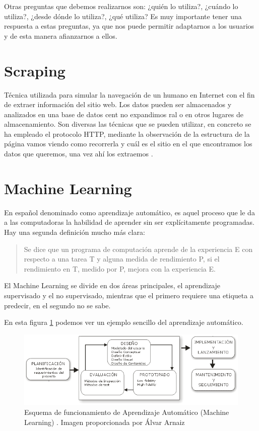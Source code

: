 Otras preguntas que debemos realizarnos son: ¿quién lo utiliza?, ¿cuándo lo utiliza?, ¿desde dónde lo utiliza?, ¿qué utiliza?
Es muy importante tener una respuesta a estas preguntas, ya que nos puede permitir adaptarnos a los usuarios y de esta manera afianzarnos a ellos.

\section{Scraping}
Técnica utilizada para simular  la navegación de un humano en Internet con el fin de extraer información del sitio web. Los datos pueden ser almacenados y analizados en una base de datos cent no expandimos ral o en otros lugares de almacenamiento.  Son diversas las técnicas que se pueden utilizar, en concreto se ha empleado el protocolo HTTP, mediante la observación de la estructura de la página vamos viendo como recorrerla y cuál es el sitio en el que encontramos los datos que queremos, una vez ahí los extraemos \cite{wiki:scraping}.

\section{Machine Learning}
En español denominado como aprendizaje automático, es aquel proceso que le da a las computadoras la habilidad de aprender sin ser explícitamente programadas. Hay una segunda definición mucho más clara:
\begin{quote}
Se dice que un programa de computación aprende de la experiencia E con respecto a una tarea T y alguna medida de rendimiento P, si el rendimiento en T, medido por P, mejora con la experiencia E.
\end{quote}
El Machine Learning se divide en dos áreas principales, el aprendizaje supervisado y el no supervisado, mientras que el primero requiere una etiqueta a predecir, en el segundo no se sabe.\cite{wiki:machine_learning}

En esta figura \ref{fig:EjMachLear} podemos ver un ejemplo sencillo del aprendizaje automático.

\begin{figure}
\centering
\includegraphics[width=.9\textwidth]{img/diseno_centrado_usuario}
\caption[Esquema de funcionamiento de Aprendizaje Automático (Machine Learning)]{Esquema de funcionamiento de Aprendizaje Automático (Machine Learning)
. Imagen proporcionada por Álvar Arnaiz}

\label{fig:EjMachLear}
\end{figure}

